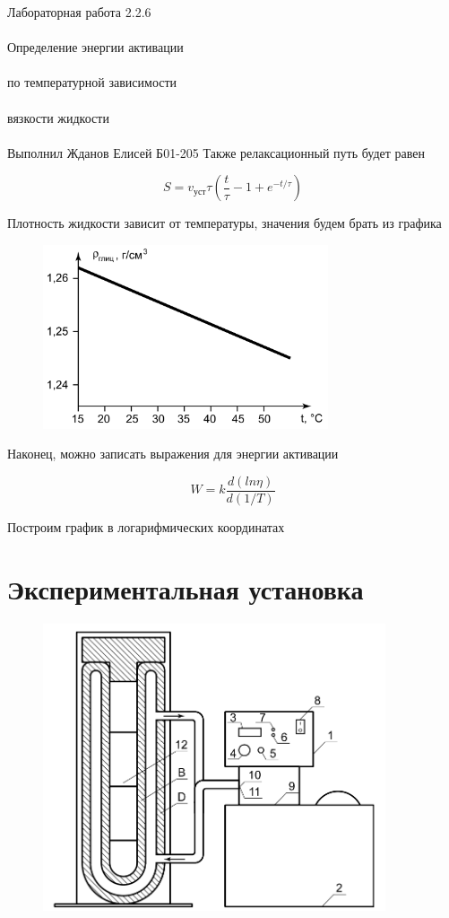 \documentclass{astroedu-lab}
\begin{document}
\begin{problem}{\huge Лабораторная работа 2.2.6\\\\Определение энергии активации\\\\по температурной зависимости\\\\вязкости жидкости\\\\Выполнил Жданов Елисей Б01-205}
Также релаксационный путь будет равен

\begin{equation}
	S = v_\text{уст} \tau \left( \frac{t}{\tau} - 1 + e^{-t/\tau} \right)
\end{equation}

Плотность жидкости зависит от температуры, значения будем брать из графика

\begin{figure}[!h]
	\centering
	\includegraphics[width=0.75\textwidth]{плотность.png}
	\label{fig:boiler}
\end{figure}

Наконец, можно записать выражения для энергии активации

\begin{equation}
	W = k \frac{d(ln \eta)}{d(1/T)}
\end{equation}

Построим график в логарифмических координатах

\section{Экспериментальная установка}

\begin{figure}[!h]
	\centering
	\includegraphics[width=0.9\textwidth]{установка.png}
	\label{fig:boiler}
\end{figure}


\end{problem}
\end{document}
